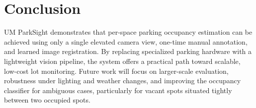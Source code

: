 \documentclass[11pt]{article}
\begin{document}
\section{Conclusion}
UM ParkSight demonstrates that per-space parking occupancy estimation can be achieved using only a single elevated camera view, one-time manual annotation, and learned image registration. By replacing specialized parking hardware with a lightweight vision pipeline, the system offers a practical path toward scalable, low-cost lot monitoring. Future work will focus on larger-scale evaluation, robustness under lighting and weather changes, and improving the occupancy classifier for ambiguous cases, particularly for vacant spots situated tightly between two occupied spots.



\end{document}
